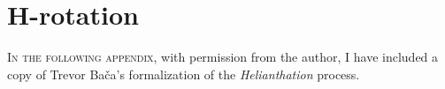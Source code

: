 \chapter{H-rotation}
\label{AppendixE}

\lettrine[lines=2,slope=-2pt,nindent=2pt]{\textcolor{SchoolColor}{I}}{n the following appendix}, with permission from the author, I have included a copy of Trevor Bača's formalization of the \textit{Helianthation} process.

\begin{center} %

  \end{center}
